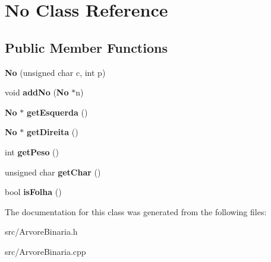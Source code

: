 \section{No Class Reference}
\label{classNo}
\subsection*{Public Member Functions}
\begin{DoxyCompactItemize}
\item 
{\bfseries No} (unsigned char c, int p)\label{classNo_a052bb0ab26f8363ba7cd2c480374f63c}

\item 
void {\bfseries addNo} ({\bf No} $\ast$n)\label{classNo_a8bedf6aad116e54bb0fc22d1e044f9f1}

\item 
{\bf No} $\ast$ {\bfseries getEsquerda} ()\label{classNo_a4332d6147b190dd87e1782b98ed0ff4f}

\item 
{\bf No} $\ast$ {\bfseries getDireita} ()\label{classNo_a4a7550a43a59338edb4c7d7f2440fac9}

\item 
int {\bfseries getPeso} ()\label{classNo_a6c842040108547560c2c371a8b0c26bc}

\item 
unsigned char {\bfseries getChar} ()\label{classNo_a010acaa9f44b43f2c237cfd70b4fd80e}

\item 
bool {\bfseries isFolha} ()\label{classNo_abc1a6962dab9ec0ded8a11486cb309a9}

\end{DoxyCompactItemize}


The documentation for this class was generated from the following files:\begin{DoxyCompactItemize}
\item 
src/ArvoreBinaria.h\item 
src/ArvoreBinaria.cpp\end{DoxyCompactItemize}
